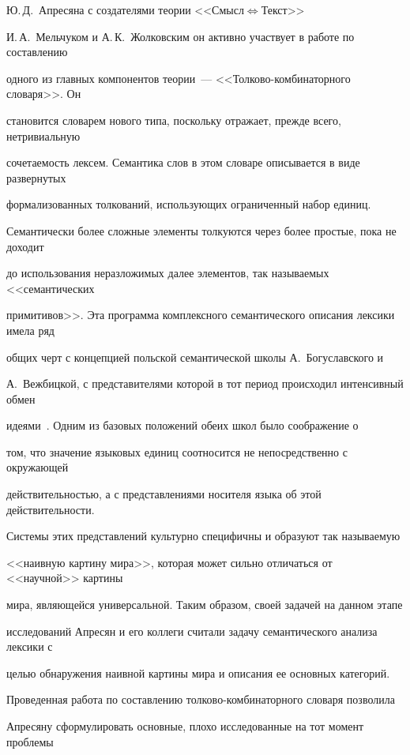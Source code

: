 Ю.\,Д.~Апресяна с создателями теории <<Смысл\;$\Leftrightarrow$\;Текст>> 


И.\,А.~Мельчуком и А.\,К.~Жолковским он активно участвует в работе по составлению 


одного из главных компонентов теории~--- <<Толково-комбинаторного словаря>>. Он 


становится словарем нового типа, поскольку отражает, прежде всего, нетривиальную 


сочетаемость лексем. Семантика слов в этом словаре описывается в виде развернутых 


формализованных толкований, использующих ограниченный набор единиц. 


Семантически более сложные элементы толкуются через более простые, пока не доходит 


до использования неразложимых далее элементов, так называемых <<семантических 


примитивов>>. Эта программа комплексного семантического описания лексики имела ряд 


общих черт с концепцией польской семантической школы А.~Богуславского и 


А.~Вежбицкой, с представителями которой в тот период происходил интенсивный обмен 


идеями~\cite{15-2-11}. Одним из базовых положений обеих школ было соображение о 


том, что значение языковых единиц соотносится не непосредственно с окружающей 


действительностью, а с пред\-став\-ле\-ни\-ями носителя языка об этой действительности. 


Системы этих представлений культурно специфичны и образуют так называемую 


<<наивную картину мира>>, которая может сильно отличаться от <<научной>> картины 


мира, являющейся универсальной. Таким образом, своей задачей на данном этапе 


исследований Апресян и его коллеги считали задачу семантического анализа лексики  с 


целью обнаружения наивной картины мира и описания ее основных категорий.


   


   Проведенная работа по составлению толково-комбинаторного словаря позволила 


Апресяну сформулировать основные, плохо исследованные на тот момент проблемы 


